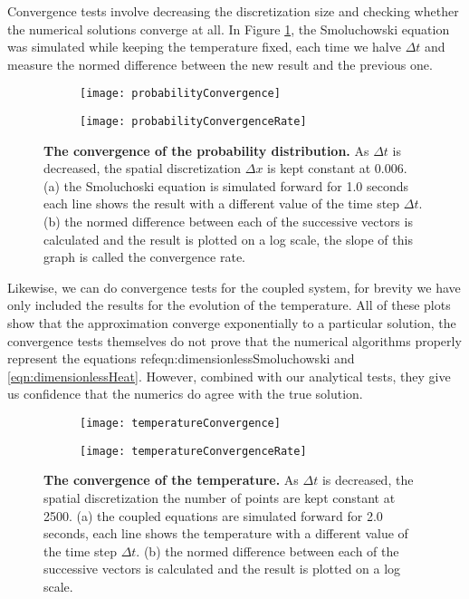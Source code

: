 Convergence tests involve decreasing the discretization size and checking whether the numerical solutions converge at all. In Figure \ref{fig:Convergence}, the Smoluchowski equation was simulated while keeping the temperature fixed, each time we halve $\Delta t$ and measure the normed difference between the new result and the previous one.


\begin{figure}
	\begin{subfigure}{0.49\textwidth}
		\texttt{[image: probabilityConvergence]}
	\end{subfigure}
	\begin{subfigure}{0.49\textwidth}
		\texttt{[image: probabilityConvergenceRate]}
	\end{subfigure}
\caption{\textbf{The convergence of the probability distribution.} As $\Delta t$ is decreased, the spatial discretization $\Delta x$ is kept constant at 0.006. (a) the Smoluchoski equation is simulated forward for 1.0 seconds each line shows the result with a different value of the time step $\Delta t$. (b) the normed difference between each of the successive vectors is calculated and the result is plotted on  a log scale, the slope of this graph is called the convergence rate.}
\label{fig:Convergence}
\end{figure}

Likewise, we can do convergence tests for the coupled system, for brevity we have only included the results for the evolution of the temperature. All of these plots show that the approximation converge exponentially to a particular solution, the convergence tests themselves do not prove that the numerical algorithms properly represent the equations ref{eqn:dimensionlessSmoluchowski} and \ref{eqn:dimensionlessHeat}. However, combined with our analytical tests, they give us confidence that the numerics do agree with the true solution.

\begin{figure}
	\begin{subfigure}{0.49\textwidth}
		\texttt{[image: temperatureConvergence]}
	\end{subfigure}
	\begin{subfigure}{0.49\textwidth}
		\texttt{[image: temperatureConvergenceRate]}
	\end{subfigure}
\caption{\textbf{The convergence of the temperature.} As $\Delta t$ is decreased, the spatial discretization the number of points are kept constant at 2500. (a) the coupled equations are simulated forward for 2.0 seconds, each line shows the temperature with a different value of the time step $\Delta t$. (b) the normed difference between each of the successive vectors is calculated and the result is plotted on  a log scale.}
\label{fig:temperatureConvergence}
\end{figure}

